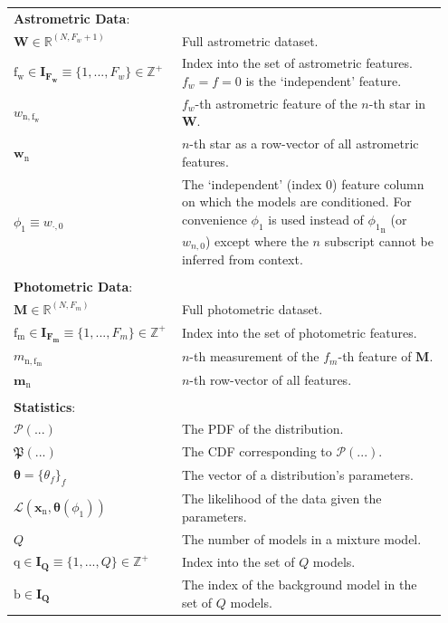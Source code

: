 \documentclass[twocolumn]{aastex631}
\newcommand{\mrm}[1]{\mathrm{#1}}
\newcommand{\mbs}[1]{\boldsymbol{#1}}
\newcommand{\mbf}[1]{\mathbf{#1}}
\newcommand{\mbb}[1]{\mathbb{#1}}
\newcommand{\mfk}[1]{\mathfrak{#1}}
\newcommand{\mcal}[1]{\mathcal{#1}}
\newcommand{\pdf}{\mcal{P}}
\newcommand{\cdf}{\mfk{P}}
\newcommand{\nth}[1]{{#1}_{\mrm{n}}}  %
\begin{document}
{\begin{table}
\begin{tabular}{p{0.35\linewidth} p{0.6\linewidth}}
    \\
    \multicolumn{2}{l}{\textbf{Astrometric Data}:}  \vspace{5pt} \\
    $\mbf{W} \in \mathbb{R}^{(N, F_w + 1)}$ & Full astrometric dataset. \\
    $\mrm{f_w} \in \mbs{I_{F_w}} \equiv \{1, ..., F_w\} \in \mathbb{Z^+}$ & Index into the set of astrometric features. $f_w = f = 0$ is the `independent' feature.\\
    $w_{\mrm{n,f_w}}$ & $f_w$-th astrometric feature of the $n$-th star in $\mbf{W}.$\\
    $\nth{\mbs{w}}$ & $n$-th star as a row-vector of all astrometric features. \\
    $\phi_1 \equiv w_{\cdot,0}$ & The `independent' (index 0) feature column on which the models are conditioned. For convenience $\phi_1$ is used instead of $\nth{\phi_1}$ (or $w_{n,0}$) except where the $n$ subscript cannot be inferred from context.\\
    \\
    \multicolumn{2}{l}{\textbf{Photometric Data}:}  \vspace{5pt} \\
    $\mbf{M} \in \mathbb{R}^{(N, F_m)}$ & Full photometric dataset. \\
    $\mrm{f_m} \in \mbs{I_{F_m}} \equiv \{1, ..., F_m\} \in \mathbb{Z^+}$ & Index into the set of photometric features. \\
    $m_{\mrm{n,f_m}}$ & $n$-th measurement of the $f_m$-th feature of $\mbf{M}$. \\
    $\nth{\mbs{m}}$ & $n$-th row-vector of all features. \\
    \\
    \multicolumn{2}{l}{\textbf{Statistics}:} \\
    \midrule
    $\pdf(...)$ & The PDF of the distribution. \\
    $\cdf(...)$ & The CDF corresponding to $\pdf(...)$. \\
    $\mbs{\theta} = \{\theta_f\}_f$ & The vector of a distribution's parameters. \\
    $\mcal{L}(\nth{\mbf{x}}, \mbs{\theta}(\phi_1))$ & The likelihood of the data given the parameters. \\
    $Q$ & The number of models in a mixture model. \\
    $\mrm{q} \in \mbs{I_Q} \equiv \{1, ..., Q \} \in \mbb{Z^+}$ & Index into the set of $Q$ models. \\
    $\mrm{b} \in \mbs{I_Q}$ & The index of the background model in the set of $Q$ models.
    \\
    \end{tabular}
    \end{table}

}
\end{document}

